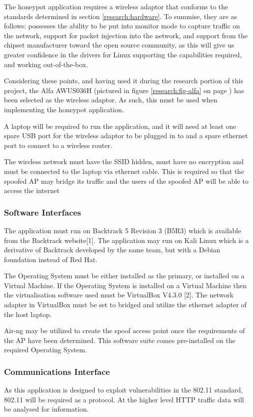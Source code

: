 The honeypot application requires a wireless adaptor that conforms to the standards determined in section \ref{research:hardware}. To summise, they are as follows: possesses the ability to be put into monitor mode to capture traffic on the network, support for packet injection into the network, and support from the chipset manufacturer toward the open source community, as this will give us greater confidence in the drivers for Linux supporting the capabilities required, and working out-of-the-box.

Considering these points, and having used it during the research portion of this project, the Alfa AWUS036H (pictured in figure \ref{research:fig-alfa} on page \pageref{research:fig-alfa}) has been selected as the wireless adaptor. As such, this must be used when implementing the honeypot application.

A laptop will be required to run the application, and it will need at least one spare USB port for the wireless adaptor to be plugged in to and a spare ethernet port to connect to a wireless router.

The wireless network must have the SSID hidden, must have no encryption and must be connected to the laptop via ethernet cable. This is required so that the spoofed AP may bridge its traffic and the users of the spoofed AP will be able to access the internet

\subsubsection{Software Interfaces}
The application must run on Backtrack 5 Revision 3 (B5R3) which is available from the Backtrack website[1]. The application may run on Kali Linux which is a derivative of Backtrack developed by the same team, but with a Debian foundation instead of Red Hat.

The Operating System must be either installed as the primary, or installed on a Virtual Machine. If the Operating System is installed on a Virtual Machine then the virtualisation software used must be VirtualBox V4.3.0 [2]. The network adapter in VirtualBox must be set to bridged and utilize the ethernet adapter of the host laptop.

Air-ng may be utilized to create the spoof access point once the requirements of the AP have been determined. This software suite comes pre-installed on the required Operating System. 

\subsubsection{Communications Interface}
As this application is designed to exploit vulnerabilities in the 802.11 standard, 802.11 will be required as a protocol. At the higher level HTTP traffic data will be analysed for information.

